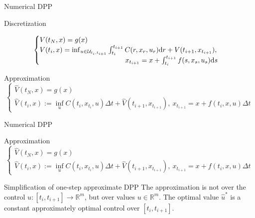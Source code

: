 \documentclass[color=usenames,dvipsnames]{beamer}
\newcommand{\ds}{\text{\normalfont d}s}
\newcommand{\dr}{\text{\normalfont d}r}
\begin{document}
\begin{frame}{Numerical DPP}
    \begin{block}
        {Discretization}
\[
\begin{cases}
V(t_{N},x) = g(x)\\
V(t_{i},x) =\inf_{u\in\mathcal{U}_{t_i,t_{i+1}}}\int_{t_i}^{t_{i+1}}C(r,x_r,u_r){{\dr}}+V(t_{i+1},x_{t_{i+1}}),\\
~~~~~~~~~~~~~~~~~~~~~~~~~~~~~~~~~~~~~x_{t_{i+1}} = x + \int_{t_i}^{t_{i+1}}f(s,x_s,u_s){\ds} 
\end{cases}
\]
    \end{block}
    \begin{block}
        {Approximation}
        \[
        \begin{cases}
        \hat{V}(t_{N},x) = g(x)\\
        \hat{V}(t_{i},x):=\inf_{u}C(t_{i},x_{t_{i}},u){{\Delta t}}+\hat{V}(t_{i+1},x_{t_{i+1}}),~x_{t_{i+1}} = x + f(t_i,x,u)\Delta t 
        \end{cases}
        \]
    \end{block}
\end{frame}
\begin{frame}{Numerical DPP}
    \begin{block}
        {Approximation}
        \[
        \begin{cases}
        \hat{V}(t_{N},x) = g(x)\\
        \hat{V}(t_{i},x):=\inf_{u}C(t_{i},x_{t_{i}},u){{\Delta t}}+\hat{V}(t_{i+1},x_{t_{i+1}}),~x_{t_{i+1}} = x + f(t_i,x,u)\Delta t 
        \end{cases}
        \]
    \end{block}
    \begin{alertblock}
        {Simplification of one-step approximate DPP}
        The  approximation is not over the control $u:[t_i,t_{i+1}]\to\mathbb{R}^m$, but over values $u\in\mathbb{R}^m$. The optimal value $\hat{u}^*$ is a constant approximately optimal control over $[t_i,t_{i+1}]$.
    \end{alertblock}
\end{frame}
\end{document}
